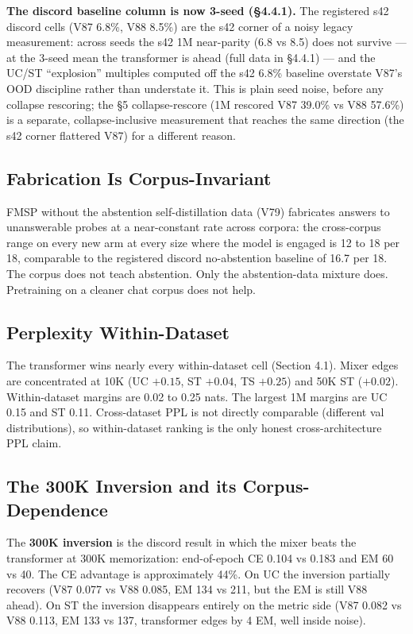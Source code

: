 \documentclass[11pt]{article}
\begin{document}
\textbf{The discord baseline column is now 3-seed (\S4.4.1).} The registered s42 discord cells (V87 6.8\%, V88 8.5\%) are the s42 corner of a noisy legacy measurement: across seeds the s42 1M near-parity (6.8 vs 8.5) does not survive --- at the 3-seed mean the transformer is ahead (full data in \S4.4.1) --- and the UC/ST ``explosion'' multiples computed off the s42 6.8\% baseline overstate V87's OOD discipline rather than understate it. This is plain seed noise, before any collapse rescoring; the \S5 collapse-rescore (1M rescored V87 39.0\% vs V88 57.6\%) is a separate, collapse-inclusive measurement that reaches the same direction (the s42 corner flattered V87) for a different reason.

\subsection{Fabrication Is Corpus-Invariant}

FMSP without the abstention self-distillation data (V79) fabricates answers to unanswerable probes at a near-constant rate across corpora: the cross-corpus range on every new arm at every size where the model is engaged is 12 to 18 per 18, comparable to the registered discord no-abstention baseline of 16.7 per 18. The corpus does not teach abstention. Only the abstention-data mixture does. Pretraining on a cleaner chat corpus does not help.

\subsection{Perplexity Within-Dataset}

The transformer wins nearly every within-dataset cell (Section 4.1). Mixer edges are concentrated at 10K (UC $+0.15$, ST $+0.04$, TS $+0.25$) and 50K ST ($+0.02$). Within-dataset margins are 0.02 to 0.25 nats. The largest 1M margins are UC 0.15 and ST 0.11. Cross-dataset PPL is not directly comparable (different val distributions), so within-dataset ranking is the only honest cross-architecture PPL claim.

\subsection{The 300K Inversion and its Corpus-Dependence}

The \textbf{300K inversion} is the discord result in which the mixer beats the transformer at 300K memorization: end-of-epoch CE 0.104 vs 0.183 and EM 60 vs 40. The CE advantage is approximately 44\%. On UC the inversion partially recovers (V87 0.077 vs V88 0.085, EM 134 vs 211, but the EM is still V88 ahead). On ST the inversion disappears entirely on the metric side (V87 0.082 vs V88 0.113, EM 133 vs 137, transformer edges by 4 EM, well inside noise).
\end{document}
